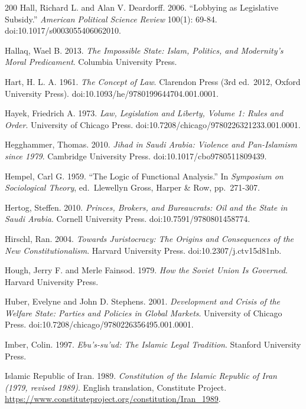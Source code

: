 \documentclass[11pt,letterpaper]{article}
\theoremstyle{definition}
\theoremstyle{remark}
\begin{document}
\begin{thebibliography}{200}
Hall, Richard L. and Alan V. Deardorff. 2006. ``Lobbying as Legislative Subsidy.'' \emph{American Political Science Review} 100(1): 69-84. doi:10.1017/s0003055406062010.

Hallaq, Wael B. 2013. \emph{The Impossible State: Islam, Politics, and Modernity's Moral Predicament}. Columbia University Press.

Hart, H. L. A. 1961. \emph{The Concept of Law}. Clarendon Press (3rd ed.~2012, Oxford University Press). doi:10.1093/he/9780199644704.001.0001.

Hayek, Friedrich A. 1973. \emph{Law, Legislation and Liberty, Volume 1: Rules and Order}. University of Chicago Press. doi:10.7208/chicago/9780226321233.001.0001.

Hegghammer, Thomas. 2010. \emph{Jihad in Saudi Arabia: Violence and Pan-Islamism since 1979}. Cambridge University Press. doi:10.1017/cbo9780511809439.

Hempel, Carl G. 1959. ``The Logic of Functional Analysis.'' In \emph{Symposium on Sociological Theory}, ed.~Llewellyn Gross, Harper \& Row, pp.~271-307.

Hertog, Steffen. 2010. \emph{Princes, Brokers, and Bureaucrats: Oil and the State in Saudi Arabia}. Cornell University Press. doi:10.7591/9780801458774.

Hirschl, Ran. 2004. \emph{Towards Juristocracy: The Origins and Consequences of the New Constitutionalism}. Harvard University Press. doi:10.2307/j.ctv15d81nb.

Hough, Jerry F. and Merle Fainsod. 1979. \emph{How the Soviet Union Is Governed}. Harvard University Press.

Huber, Evelyne and John D. Stephens. 2001. \emph{Development and Crisis of the Welfare State: Parties and Policies in Global Markets}. University of Chicago Press. doi:10.7208/chicago/9780226356495.001.0001.

Imber, Colin. 1997. \emph{Ebu's-su'ud: The Islamic Legal Tradition}. Stanford University Press.

Islamic Republic of Iran. 1989. \emph{Constitution of the Islamic Republic of Iran (1979, revised 1989)}. English translation, Constitute Project. \url{https://www.constituteproject.org/constitution/Iran_1989}.


\end{thebibliography}
\end{document}
